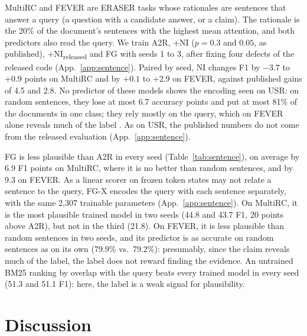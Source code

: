 \documentclass[11pt]{article}
\begin{document}
MultiRC \citep{khashabi-etal-2018-looking} and FEVER \citep{thorne-etal-2018-fever} are ERASER tasks whose rationales are sentences that answer a query (a question with a candidate answer, or a claim). The rationale is the 20\% of the document's sentences with the highest mean attention, and both predictors also read the query. We train A2R, +NI ($p = 0.3$ and $0.05$, as published), +NI\textsubscript{released} and FG with seeds 1 to 3, after fixing four defects of the released code (App.~\ref{app:sentence}). Paired by seed, NI changes F1 by $-3.7$ to $+0.9$ points on MultiRC and by $+0.1$ to $+2.9$ on FEVER, against published gains of 4.5 and 2.8. No predictor of these models shows the encoding seen on USR: on random sentences, they lose at most 6.7 accuracy points and put at most 81\% of the documents in one class; they rely mostly on the query, which on FEVER alone reveals much of the label \citep{schuster-etal-2019-towards}. As on USR, the published numbers do not come from the released evaluation (App.~\ref{app:sentence}).

FG is less plausible than A2R in every seed (Table~\ref{tab:sentence}), on average by 6.9 F1 points on MultiRC, where it is no better than random sentences, and by 9.3 on FEVER. As a linear scorer on frozen token states may not relate a sentence to the query, FG-X encodes the query with each sentence separately, with the same 2,307 trainable parameters (App.~\ref{app:sentence}). On MultiRC, it is the most plausible trained model in two seeds (44.8 and 43.7 F1, 20 points above A2R), but not in the third (21.8). On FEVER, it is less plausible than random sentences in two seeds, and its predictor is as accurate on random sentences as on its own (79.9\% vs.\ 79.2\%): presumably, since the claim reveals much of the label, the label does not reward finding the evidence. An untrained BM25 ranking by overlap with the query beats every trained model in every seed (51.3 and 51.1 F1): here, the label is a weak signal for plausibility.

\section{Discussion}
\label{sec:discussion}
\end{document}
